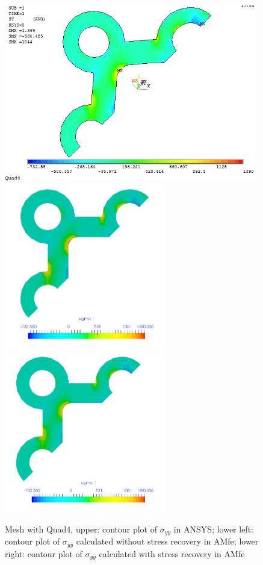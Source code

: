 \begin{figure}[htbp]
	\begin{center}
		\includegraphics[width=11cm,clip]{Quad4_Syy.png} 
		\includegraphics[width=7cm,clip]{Quad4_Syy_PD.png} 			
		\includegraphics[width=7cm,clip]{Quad4_Syy_P.png} 		
		\caption{Mesh with Quad4, upper: contour plot of $\sigma_{yy}$ in ANSYS; lower left: contour plot of $\sigma_{yy}$ calculated without stress recovery in AMfe; lower right: contour plot of $\sigma_{yy}$ calculated with stress recovery in AMfe} \label{fig: Quad4_Syy}
	\end{center}
\end{figure}
\clearpage 

